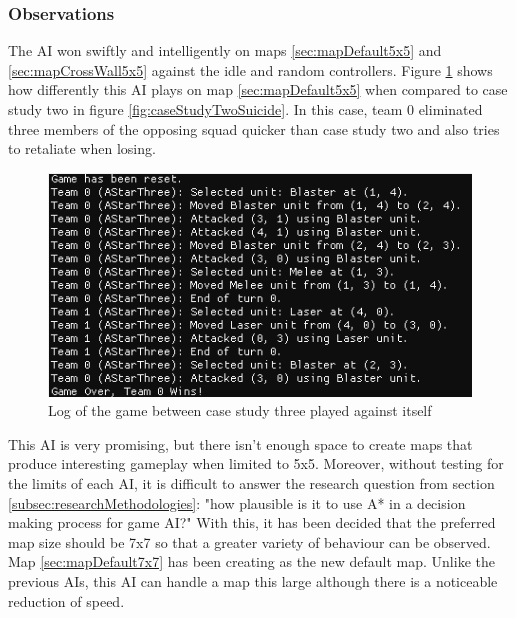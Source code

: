 \documentclass[11pt, a4paper]{report}
\begin{document}
\subsubsection{Observations}

The AI won swiftly and intelligently on maps \ref{sec:mapDefault5x5} and \ref{sec:mapCrossWall5x5} against the idle and random controllers. Figure \ref{fig:caseStudyThreeGame} shows how differently this AI plays on map \ref{sec:mapDefault5x5} when compared to case study two in figure \ref{fig:caseStudyTwoSuicide}. In this case, team 0 eliminated three members of the opposing squad quicker than case study two and also tries to retaliate when losing.

\begin{figure}[!h]
  \centering
  \includegraphics[width=12cm]{img/case_three_game.png}
  \caption{Log of the game between case study three played against itself}
  \label{fig:caseStudyThreeGame}
\end{figure}

This AI is very promising, but there isn't enough space to create maps that produce interesting gameplay when limited to 5x5. Moreover, without testing for the limits of each AI, it is difficult to answer the research question from section \ref{subsec:researchMethodologies}: "how plausible is it to use A* in a decision making process for game AI?" With this, it has been decided that the preferred map size should be 7x7 so that a greater variety of behaviour can be observed. Map \ref{sec:mapDefault7x7} has been creating as the new default map. Unlike the previous AIs, this AI can handle a map this large although there is a noticeable reduction of speed.
\end{document}
